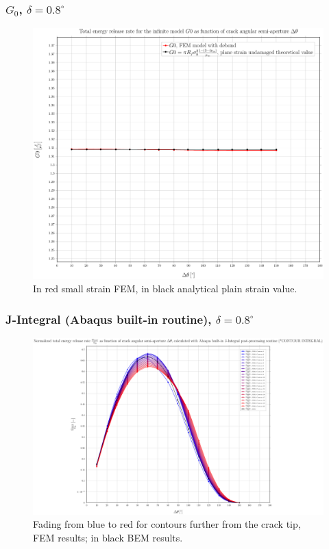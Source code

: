 \documentclass[first,firstsupp,lastsupp,handout,last,hyperref,table]{ETHclass}
\begin{document}
\begin{frame}
\frametitle{\small $G_{0}$, $\delta=0.8^{\circ}$}
\vspace{-0.5cm}
\centering
\captionsetup[figure]{font=scriptsize,labelfont=scriptsize}
\begin{figure}[!h]
\centering
\includegraphics[height=0.7\textheight]{2017-07-10_AbqRunSummary_SmallStrainD08_G0_Summary.pdf}
  \caption{\scriptsize In red small strain FEM, in black analytical plain strain value.}
  \label{fig:res1}
\end{figure}
\end{frame}

\begin{frame}
\frametitle{\small J-Integral (Abaqus built-in routine), $\delta=0.8^{\circ}$}
\vspace{-0.5cm}
\centering
\captionsetup[figure]{font=scriptsize,labelfont=scriptsize}
\begin{figure}[!h]
\centering
\includegraphics[height=0.7\textheight]{2017-07-10_AbqRunSummary_SmallStrainD08_J-INT_Summary.pdf}
  \caption{\scriptsize Fading from blue to red for contours further from the crack tip, FEM results; in black BEM results.}
  \label{fig:res1}
\end{figure}
\end{frame}
\end{document}
